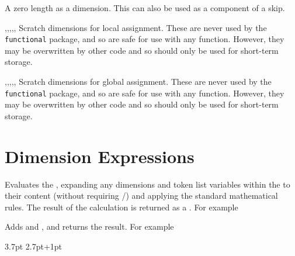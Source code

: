 \documentclass[oneside]{book}
\begin{document}
\begin{variable}{\cZeroDim}
A zero length as a dimension.  This can also be used as a component
of a skip.
\end{variable}

\begin{variable}{\lTmpaDim,\lTmpbDim,\lTmpcDim,\lTmpiDim,\lTmpjDim,\lTmpkDim}
Scratch dimensions for local assignment. These are never used by
the \verb!functional! package, and so are safe for use with any
function. However, they may be overwritten by other
code and so should only be used for short-term storage.
\end{variable}

\begin{variable}{\gTmpaDim,\gTmpbDim,\gTmpcDim,\gTmpiDim,\gTmpjDim,\gTmpkDim}
Scratch dimensions for global assignment. These are never used by
the \verb!functional! package, and so are safe for use with any
function. However, they may be overwritten by other
code and so should only be used for short-term storage.
\end{variable}

\section{Dimension Expressions}

\begin{function}{\DimEval}
\begin{syntax}
 
\end{syntax}
Evaluates the , expanding any
dimensions and token list variables within the 
to their content (without requiring /)
and applying the standard mathematical rules. The result of the
calculation is returned as a .
For example
\begin{demohigh}
\end{demohigh}
\end{function}

\begin{function}{\DimMathAdd}
\begin{syntax}
  
\end{syntax}
Adds  and ,
and returns the result. For example
\begin{demohigh}
\DimMathAdd {2.8pt} {3.7pt}
\DimMathAdd {3.8pt-1pt} {2.7pt+1pt}
\end{demohigh}
\end{function}
\end{document}
